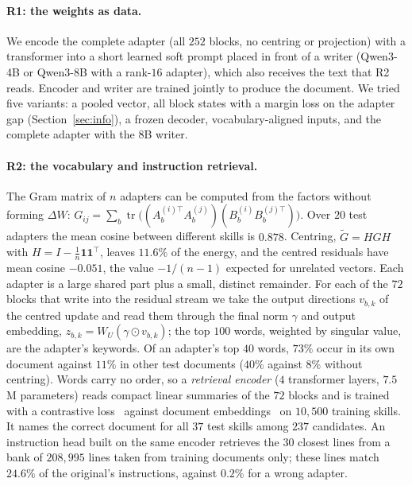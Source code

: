 \documentclass[11pt]{article}
\begin{document}
\paragraph{R1: the weights as data.} We encode the complete adapter (all $252$ blocks, no centring or projection) with a transformer into a short
learned soft prompt placed in front of a writer (Qwen3-4B or Qwen3-8B with a rank-$16$ adapter), which also receives the text that R2 reads.
Encoder and writer are trained jointly to produce the document. We tried five variants: a pooled vector, all block states with a margin loss on
the adapter gap (Section~\ref{sec:info}), a frozen decoder, vocabulary-aligned inputs, and the complete adapter with the 8B writer.

\paragraph{R2: the vocabulary and instruction retrieval.} The Gram matrix of $n$ adapters can be computed from the factors without forming $\Delta W$:
$G_{ij}=\sum_b\operatorname{tr}\big((A_b^{(i)\top}A_b^{(j)})(B_b^{(i)}B_b^{(j)\top})\big)$. Over $20$ test adapters the mean cosine between
different skills is $0.878$. Centring, $\tilde G=HGH$ with $H=I-\tfrac1n\mathbf 1\mathbf 1^{\top}$, leaves $11.6\%$ of the energy, and the centred
residuals have mean cosine $-0.051$, the value $-1/(n-1)$ expected for unrelated vectors. Each adapter is a large shared part plus a small,
distinct remainder. For each of the $72$ blocks that write into the residual stream we take the output directions $v_{b,k}$ of the centred update
and read them through the final norm $\gamma$ and output embedding, $z_{b,k}=W_U(\gamma\odot v_{b,k})$; the top $100$ words, weighted by
singular value, are the adapter's keywords. Of an adapter's top $40$ words, $73\%$ occur in its own document against $11\%$ in other test documents
($40\%$ against $8\%$ without centring). Words carry no order, so a \emph{retrieval encoder} ($4$ transformer layers, $7.5$M parameters) reads
compact linear summaries of the $72$ blocks and is trained with a contrastive loss~\cite{infonce,clip} against document embeddings~\cite{qwen3emb}
on $10{,}500$ training skills. It names the correct document for all $37$ test skills among $237$ candidates. An instruction head built on the same
encoder retrieves the $30$ closest lines from a bank of $208{,}995$ lines taken from training documents only; these lines match $24.6\%$ of the original's
instructions, against $0.2\%$ for a wrong adapter.
\end{document}
